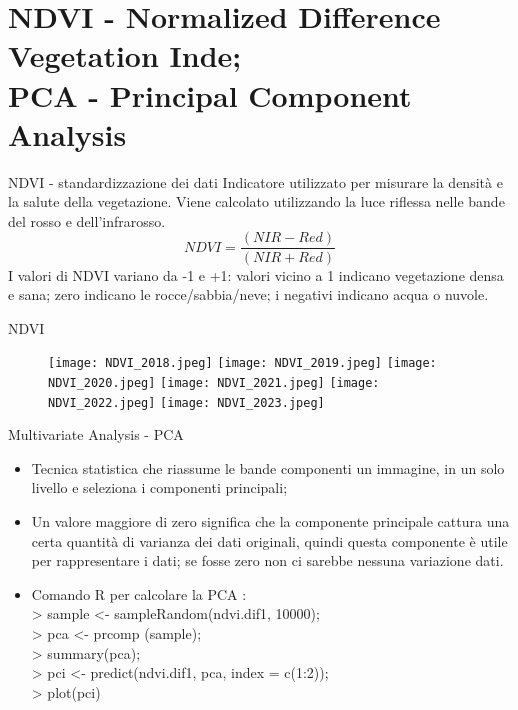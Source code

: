 \documentclass[10pt]{beamer}
\begin{document}
\section{NDVI - Normalized Difference Vegetation Inde; \\
PCA - Principal Component Analysis}
\begin{frame}{NDVI - standardizzazione dei dati}
Indicatore utilizzato per misurare la densità e la salute della vegetazione. Viene calcolato utilizzando la luce riflessa nelle bande del rosso e dell'infrarosso.
\begin{equation}
NDVI = \frac{(NIR-Red)}{(NIR+Red)} 
\end{equation}
\label{NDVI}
I valori di NDVI variano da -1 e +1: valori vicino a 1 indicano vegetazione densa e sana; zero indicano le rocce/sabbia/neve; i negativi indicano acqua o nuvole. 
\end{frame}

\begin{frame}{NDVI}
\begin{figure}
        \centering
        \texttt{[image: NDVI\_2018.jpeg]}
        \texttt{[image: NDVI\_2019.jpeg]} 
        \texttt{[image: NDVI\_2020.jpeg]}
        \texttt{[image: NDVI\_2021.jpeg]}
        \texttt{[image: NDVI\_2022.jpeg]} 
        \texttt{[image: NDVI\_2023.jpeg]}
    \end{figure}
\end{frame}

\begin{frame}{Multivariate Analysis - PCA}
\begin{itemize}
    \item Tecnica statistica che riassume le bande componenti un immagine, in un solo livello e seleziona i componenti principali; 
    \item Un valore maggiore di zero significa che la componente principale cattura una certa quantità di varianza dei dati originali, quindi questa componente è utile per rappresentare i dati; se fosse zero non ci sarebbe nessuna variazione dati.
    \item Comando R per calcolare la PCA : \\
            > sample <- sampleRandom(ndvi.dif1, 10000); \\
            > pca <- prcomp (sample);\\
            > summary(pca);\\
            > pci <- predict(ndvi.dif1, pca, index = c(1:2));\\
            > plot(pci)
\end{itemize}
\end{frame}
\end{document}

